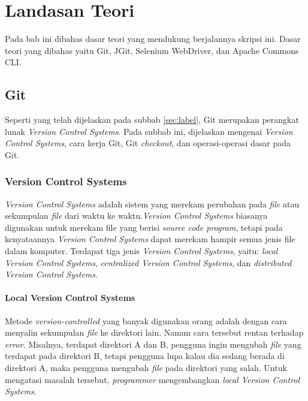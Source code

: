 \chapter{Landasan Teori}
\label{chap:teori}

Pada bab ini dibahas dasar teori yang mendukung berjalannya skripsi ini. Dasar teori yang dibahas yaitu Git, JGit, Selenium WebDriver, dan Apache Commons CLI.

\section{Git}
\label{sec:git} 
Seperti yang telah dijelaskan pada subbab \ref{sec:label}, Git merupakan perangkat lunak \textit{Version Control Systems}. Pada subbab ini, dijelaskan mengenai \textit{Version Control Systems}, cara kerja Git, Git \textit{checkout}, dan operasi-operasi dasar pada Git.   

\subsection{Version Control Systems}
\label{subsec:vcs}
\textit{Version Control Systems} adalah sistem yang merekam perubahan pada \textit{file} atau sekumpulan \textit{file} dari waktu ke waktu\cite{chacon2014pro}.\textit{Version Control Systems} biasanya digunakan  untuk merekam file yang berisi \textit{source code program}, tetapi pada kenyataannya \textit{Version Control Systems} dapat merekam hampir semua jenis file dalam komputer. Terdapat tiga jenis \textit{Version Control Systems}, yaitu: \textit{local Version Control Systems}, \textit{centralized Version Control Systems}, dan \textit{distributed Version Control Systems}.

\subsubsection{Local Version Control Systems}
Metode \textit{version-controlled} yang banyak digunakan orang adalah dengan cara menyalin sekumpulan \textit{file} ke direktori lain\cite{chacon2014pro}. Namun cara tersebut rentan terhadap \textit{error}.
Misalnya, terdapat direktori A dan B, pengguna ingin mengubah \textit{file} yang terdapat pada direktori B, tetapi pengguna lupa kalau dia sedang berada di direktori A, maka pengguna mengubah \textit{file} pada direktori yang salah. Untuk mengatasi masalah tersebut, \textit{programmer} mengembangkan \textit{local Version Control Systems}. 

